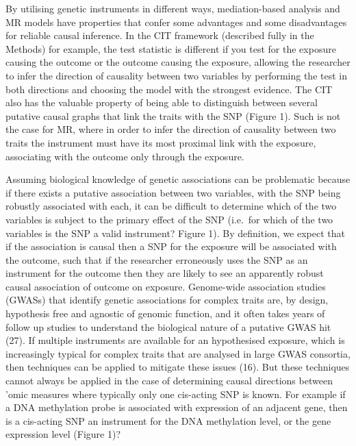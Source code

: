 \documentclass[]{article}
\begin{document}
By utilising genetic instruments in different ways, mediation-based
analysis and MR models have properties that confer some advantages and
some disadvantages for reliable causal inference. In the CIT framework
(described fully in the Methods) for example, the test statistic is
different if you test for the exposure causing the outcome or the
outcome causing the exposure, allowing the researcher to infer the
direction of causality between two variables by performing the test in
both directions and choosing the model with the strongest evidence. The
CIT also has the valuable property of being able to distinguish between
several putative causal graphs that link the traits with the SNP (Figure
1). Such is not the case for MR, where in order to infer the direction
of causality between two traits the instrument must have its most
proximal link with the exposure, associating with the outcome only
through the exposure.

Assuming biological knowledge of genetic associations can be problematic
because if there exists a putative association between two variables,
with the SNP being robustly associated with each, it can be difficult to
determine which of the two variables is subject to the primary effect of
the SNP (i.e.~for which of the two variables is the SNP a valid
instrument? Figure 1). By definition, we expect that if the association
is causal then a SNP for the exposure will be associated with the
outcome, such that if the researcher erroneously uses the SNP as an
instrument for the outcome then they are likely to see an apparently
robust causal association of outcome on exposure. Genome-wide
association studies (GWASs) that identify genetic associations for
complex traits are, by design, hypothesis free and agnostic of genomic
function, and it often takes years of follow up studies to understand
the biological nature of a putative GWAS hit (27). If multiple
instruments are available for an hypothesised exposure, which is
increasingly typical for complex traits that are analysed in large GWAS
consortia, then techniques can be applied to mitigate these issues (16).
But these techniques cannot always be applied in the case of determining
causal directions between 'omic measures where typically only one
cis-acting SNP is known. For example if a DNA methylation probe is
associated with expression of an adjacent gene, then is a cis-acting SNP
an instrument for the DNA methylation level, or the gene expression
level (Figure 1)?
\end{document}
